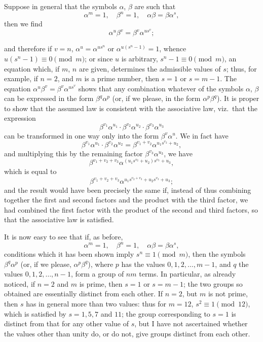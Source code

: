 \documentclass[11pt,a4paper]{article}
\begin{document}
Suppose in general that the symbols $\alpha$, $\beta$ are such that
\[
\alpha^{m} = 1,\quad \beta^{n} = 1,\quad \alpha\beta = \beta\alpha^{s},
\]
then we find
\[
\alpha^{u}\beta^{v} = \beta^{v}\alpha^{u s^{v}};
\]

\setcounter{page}{90}

and therefore if $v = n$, $\alpha^{u} = \alpha^{u s^{n}}$ or $\alpha^{u(s^{n} - 1)} = 1$, whence $u(s^{n} - 1) \equiv 0 \pmod{m}$; or since $u$ is arbitrary, $s^{n} - 1 \equiv 0 \pmod{m}$, an equation which, if $m$, $n$ are given, determines the admissible values of $s$; thus, for example, if $n = 2$, and $m$ is a prime number, then $s = 1$ or $s = m - 1$. The equation $\alpha^{u}\beta^{v} = \beta^{v}\alpha^{u s^{v}}$ shows that any combination whatever of the symbols $\alpha$, $\beta$ can be expressed in the form $\beta^{q}\alpha^{p}$ (or, if we please, in the form $\alpha^{p}\beta^{q}$). It is proper to show that the assumed law is consistent with the associative law, viz.\ that the expression
\[
\beta^{v_{1}}\alpha^{u_{1}} \cdot \beta^{v_{2}}\alpha^{u_{2}} \cdot \beta^{v_{3}}\alpha^{u_{3}}
\]
can be transformed in one way only into the form $\beta^{v}\alpha^{u}$. We in fact have
\[
\beta^{v_{1}}\alpha^{u_{1}} \cdot \beta^{v_{2}}\alpha^{u_{2}} = \beta^{v_{1}+v_{2}}\alpha^{u_{1}s^{v_{2}}+u_{2}},
\]
and multiplying this by the remaining factor $\beta^{v_{3}}\alpha^{u_{3}}$, we have
\[
\beta^{v_{1}+v_{2}+v_{3}}\alpha^{(u_{1}s^{v_{2}}+u_{2})s^{v_{3}} + u_{3}},
\]
which is equal to
\[
\beta^{v_{1}+v_{2}+v_{3}}\alpha^{u_{1}s^{v_{2}+v_{3}}+u_{2}s^{v_{3}}+u_{3}};
\]
and the result would have been precisely the same if, instead of thus combining together the first and second factors and the product with the third factor, we had combined the first factor with the product of the second and third factors, so that the associative law is satisfied.

It is now easy to see that if, as before,
\[
\alpha^{m} = 1,\quad \beta^{n} = 1,\quad \alpha\beta = \beta\alpha^{s},
\]
conditions which it has been shown imply $s^{n} \equiv 1 \pmod{m}$, then the symbols $\beta^{q}\alpha^{p}$ (or, if we please, $\alpha^{p}\beta^{q}$), where $p$ has the values $0, 1, 2, \ldots, m-1$, and $q$ the values $0, 1, 2, \ldots, n-1$, form a group of $nm$ terms. In particular, as already noticed, if $n=2$ and $m$ is prime, then $s = 1$ or $s = m-1$; the two groups so obtained are essentially distinct from each other. If $n = 2$, but $m$ is not prime, then $s$ has in general more than two values: thus for $m=12$, $s^{2} \equiv 1 \pmod{12}$, which is satisfied by $s = 1, 5, 7$ and $11$; the group corresponding to $s = 1$ is distinct from that for any other value of $s$, but I have not ascertained whether the values other than unity do, or do not, give groups distinct from each other.
\end{document}
